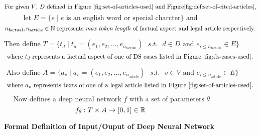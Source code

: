 \begin{figure}[ht]
    \[\text{For given $V$, $D$ defined in Figure \ref{fig:set-of-articles-used} and  Figure\ref{fig:def:set-of-cited-articles},}\]
    \[\text{ let } E = \{e \mid e \text{ is an english word or special charcter} \} \text{ and }\]
    \[n_{\text{factual}}, n_{\text{article}} \in \Bbb N \text{ represents \textit{max token length} of factual aspect and legal article respectively}. \]
    
    \[\text{Then define } T = \{t_d \mid t_d = (e_1, e_2, \ldots , e_{n_\text{factual}}) \text{ } s.t. \text{ } d \in D \text{ and } e_{i \le{n_{\text{factual}}}  } \in E \} \]
    \[\text{ where } t_d \text{ represents a factual aspect of one of DS cases listed in Figure \ref{fig:ds-cases-used}. }\]
    
    \[\text{ Also define } A = \{a_v \mid a_v = (e_1, e_2, \ldots , e_{n_\text{article}}) \text{ } s.t. \text{ } v \in V \text{ and } e_{i \le{n_{\text{article}}}  } \in E \}  \]
    \[\text{ where } a_v \text{ represents texts of one of a legal article listed in Figure \ref{fig:set-of-articles-used}. }\]

    \[\text{ Now defines a deep neural network } f \text{ with a set of parameters } \theta \]
    \[f_{\theta}: T \times A \to [0, 1] \in \Bbb R \]


    \caption{\textbf{Formal Definition of Input/Ouput of Deep Neural Network}}
    \label{fig:def:io:nn}

\end{figure}